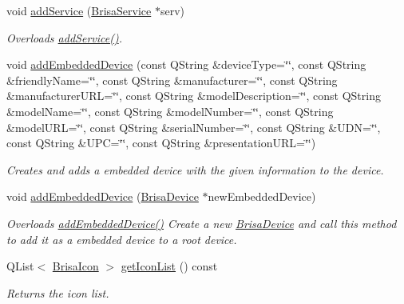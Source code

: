 \begin{DoxyCompactItemize}
void \hyperlink{classBrisaUpnp_1_1BrisaDevice_afb43e358eaea3fe0834d1d82913ba1ec}{addService} (\hyperlink{classBrisaUpnp_1_1BrisaService}{BrisaService} $\ast$serv)
\begin{DoxyCompactList}\small\item\em Overloads \hyperlink{classBrisaUpnp_1_1BrisaDevice_a2a5879c40079f073fc08b06d99427dcd}{addService()}. \item\end{DoxyCompactList}\item 
void \hyperlink{classBrisaUpnp_1_1BrisaDevice_a5b549e316a783368e9bf0e0ffd09a5e4}{addEmbeddedDevice} (const QString \&deviceType=\char`\"{}\char`\"{}, const QString \&friendlyName=\char`\"{}\char`\"{}, const QString \&manufacturer=\char`\"{}\char`\"{}, const QString \&manufacturerURL=\char`\"{}\char`\"{}, const QString \&modelDescription=\char`\"{}\char`\"{}, const QString \&modelName=\char`\"{}\char`\"{}, const QString \&modelNumber=\char`\"{}\char`\"{}, const QString \&modelURL=\char`\"{}\char`\"{}, const QString \&serialNumber=\char`\"{}\char`\"{}, const QString \&UDN=\char`\"{}\char`\"{}, const QString \&UPC=\char`\"{}\char`\"{}, const QString \&presentationURL=\char`\"{}\char`\"{})
\begin{DoxyCompactList}\small\item\em Creates and adds a embedded device with the given information to the device. \item\end{DoxyCompactList}\item 
void \hyperlink{classBrisaUpnp_1_1BrisaDevice_abfdfabc11ad5c39300ea9967ed7122a8}{addEmbeddedDevice} (\hyperlink{classBrisaUpnp_1_1BrisaDevice}{BrisaDevice} $\ast$newEmbeddedDevice)
\begin{DoxyCompactList}\small\item\em Overloads \hyperlink{classBrisaUpnp_1_1BrisaDevice_a5b549e316a783368e9bf0e0ffd09a5e4}{addEmbeddedDevice()} Create a new {\itshape \hyperlink{classBrisaUpnp_1_1BrisaDevice}{BrisaDevice}\/} and call this method to add it as a embedded device to a root device. \item\end{DoxyCompactList}\item 
QList$<$ \hyperlink{classBrisaUpnp_1_1BrisaIcon}{BrisaIcon} $>$ \hyperlink{classBrisaUpnp_1_1BrisaDevice_a7263a7b99c2a4972d4a728f32ddd6e7d}{getIconList} () const 
\begin{DoxyCompactList}\small\item\em Returns the icon list. \item\end{DoxyCompactList}\item 

\end{DoxyCompactItemize}
